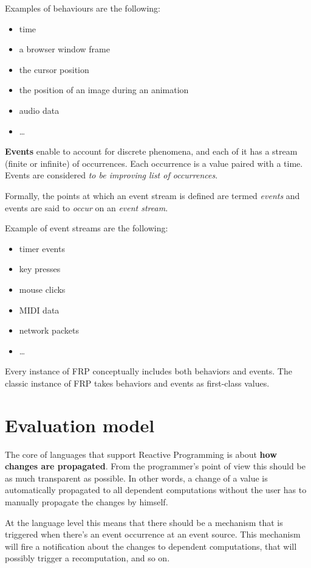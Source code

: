 Examples of behaviours are the following:

\begin{itemize}
\itemsep1pt\parskip0pt
\item
  time
\item
  a browser window frame
\item
  the cursor position
\item
  the position of an image during an animation
\item
  audio data
\item
  \ldots{}
\end{itemize}

\textbf{Events} enable to account for discrete phenomena, and each of it
has a stream (finite or infinite) of occurrences. Each occurrence is a
value paired with a time. Events are considered \emph{to be improving
list of occurrences}.

Formally, the points at which an event stream is defined are termed
\emph{events} and events are said to \emph{occur} on an \emph{event
stream}.

Example of event streams are the following:

\begin{itemize}
\itemsep1pt\parskip0pt
\item
  timer events
\item
  key presses
\item
  mouse clicks
\item
  MIDI data
\item
  network packets
\item
  \ldots{}
\end{itemize}

Every instance of FRP conceptually includes both behaviors and events.
The classic instance of FRP takes behaviors and events as first-class
values.

\section{Evaluation model}\label{evaluation-model}

The core of languages that support Reactive Programming is about
\textbf{how changes are propagated}. From the programmer's point of view
this should be as much transparent as possible. In other words, a change
of a value is automatically propagated to all dependent computations
without the user has to manually propagate the changes by himself.

At the language level this means that there should be a mechanism that
is triggered when there's an event occurrence at an event source. This
mechanism will fire a notification about the changes to dependent
computations, that will possibly trigger a recomputation, and so on.

